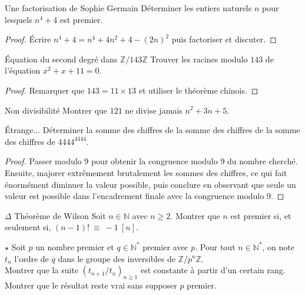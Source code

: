\documentclass[french,a4paper]{article}
\newcommand{\N}{\mathbb{N}}
\newcommand{\Z}{\mathbb{Z}}
\newcommand{\st}{^*}
\theoremstyle{plain}
\theoremstyle{definition}
\theoremstyle{remark}
\begin{document}
\begin{ex}[Moulin.52]{Une factorisation de Sophie Germain}
	Déterminer les entiers naturels $n$ pour lesquels $n^4+4$ est premier.
\end{ex}
\begin{proof}
	Écrire $n^4+4=n^4+4n^2+4-(2n)^2$ puis factoriser et discuter.
\end{proof}

\begin{ex}[Moulin.53]{Équation du second degré dans $\Z/143\Z$}
	Trouver les racines modulo $143$ de l'équation $x^2+x+11=0$.
\end{ex}
\begin{proof}
	Remarquer que $143=11\times 13$ et utiliser le théorème chinois.
\end{proof}

\begin{ex}[Moulin.54]{Non divisibilité}
	Montrer que $121$ ne divise jamais $n^2+3n+5$.
\end{ex}

\begin{ex}{Étrange...}
	Déterminer la somme des chiffres de la somme des chiffres de la somme des chiffres de $4444^{4444}$.
\end{ex}
\begin{proof}
	Passer modulo $9$ pour obtenir la congruence modulo $9$ du nombre cherché. Ensuite, majorer extrêmement brutalement les sommes des chiffres, ce qui fait énormément diminuer la valeur possible, puis conclure en observant que seule un valeur est possible dans l'encadrement finale avec la congruence modulo $9$.
\end{proof}

\begin{ex}[Moulin.55]{$\Delta$ Théorème de Wilson}
	Soit $n\in\N$ avec $n\geqslant 2$. Montrer que $n$ est premier si, et seulement si, $(n-1)!\ \equiv\ -1\ [n]$.
\end{ex}

\begin{ex}[Moulin.56]{$\star$}
	Soit $p$ un nombre premier et $q\in\N\st$ premier avec $p$. Pour tout $n\in\N\st$, on note $t_n$ l'ordre de $\overline{q}$ dans le groupe des inversibles de $\Z/p^n\Z$. \\ Montrer que la suite $(t_{n+1}/t_n)_{n\geqslant 1}$ est constante à partir d'un certain rang.\\ Montrer que le résultat reste vrai sans supposer $p$ premier.
\end{ex}
\end{document}
